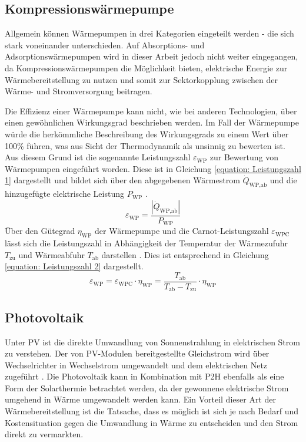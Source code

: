 \subsection{Kompressionswärmepumpe}\label{subsection: Wärmepumpe}
Allgemein können Wärmepumpen in drei Kategorien eingeteilt werden - die sich stark voneinander unterschieden. Auf Absorptions- und Adsorptionswärmepumpen wird in dieser Arbeit jedoch nicht weiter eingegangen, da Kompressionswärmepumpen die Möglichkeit bieten, elektrische Energie zur Wärmebereitstellung zu nutzen und somit zur Sektorkopplung zwischen der Wärme- und Stromversorgung beitragen. 

Die Effizienz einer Wärmepumpe kann nicht, wie bei anderen Technologien, über einen gewöhnlichen Wirkungsgrad beschrieben werden. Im Fall der Wärmepumpe würde die herkömmliche Beschreibung des Wirkungsgrads zu einem Wert über 100\% führen, was aus Sicht der Thermodynamik als unsinnig zu bewerten ist. Aus diesem Grund ist die sogenannte Leistungszahl $\varepsilon_\text{WP}$ zur Bewertung von Wärmepumpen eingeführt worden. Diese ist in Gleichung \ref{equation: Leistungszahl 1} dargestellt und bildet sich über den abgegebenen Wärmestrom $\dot{Q}_\text{WP,ab}$ und die hinzugefügte elektrische Leistung $P_\text{WP}$ \cite{Baehr2012}.
	\begin{equation}\label{equation: Leistungszahl 1}
		\varepsilon_\text{WP} = \dfrac{|\dot{Q}_\text{WP,ab}|}{P_\text{WP}}
	\end{equation}
Über den Gütegrad $\eta_\text{WP}$ der Wärmepumpe und die Carnot-Leistungszahl $\varepsilon_\text{WPC}$ lässt sich die Leistungszahl in Abhängigkeit der Temperatur der Wärmezufuhr $T_\text{zu}$ und Wärmeabfuhr $T_\text{ab}$ darstellen \cite{HESARAKI20151199}. Dies ist entsprechend in Gleichung \ref{equation: Leistungszahl 2} dargestellt.
	\begin{equation}\label{equation: Leistungszahl 2}
		\varepsilon_\text{WP} = \varepsilon_\text{WPC} \cdot \eta_\text{WP} = \dfrac{T_\text{ab}}{T_\text{ab} - T_\text{zu}} \cdot \eta_\text{WP}
	\end{equation}


\subsection{Photovoltaik}\label{subsection: Grundlagen Photovoltaik}
Unter \ac{PV} ist die direkte Umwandlung von Sonnenstrahlung in elektrischen Strom zu verstehen. Der von \ac{PV}-Modulen bereitgestellte Gleichstrom wird über Wechselrichter in Wechselstrom umgewandelt und dem elektrischen Netz zugeführt \cite{Watter2013}. Die Photovoltaik kann in Kombination mit \ac{P2H} ebenfalls als eine Form der Solarthermie betrachtet werden, da der gewonnene elektrische Strom umgehend in Wärme umgewandelt werden kann. Ein Vorteil dieser Art der Wärmebereitstellung ist die Tatsache, dass es möglich ist sich je nach Bedarf und Kostensituation gegen die Umwandlung in Wärme zu entscheiden und den Strom direkt zu vermarkten.

